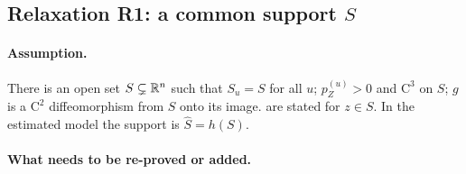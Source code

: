\subsection{Relaxation R1: a common support $S$}
\label{app:support:r1}

\paragraph{Assumption.} There is an open set $S\subsetneq\mathbb{R}^n$ such that $S_u=S$ for all $u$; $p^{(u)}_Z>0$
and $\mathrm{C}^3$ on $S$; $g$ is a $\mathrm{C}^2$ diffeomorphism from $S$ onto its image. 
are stated for $z\in S$. In the estimated model the support is $\hat S=h(S)$.

\paragraph{What needs to be re-proved or added.}
